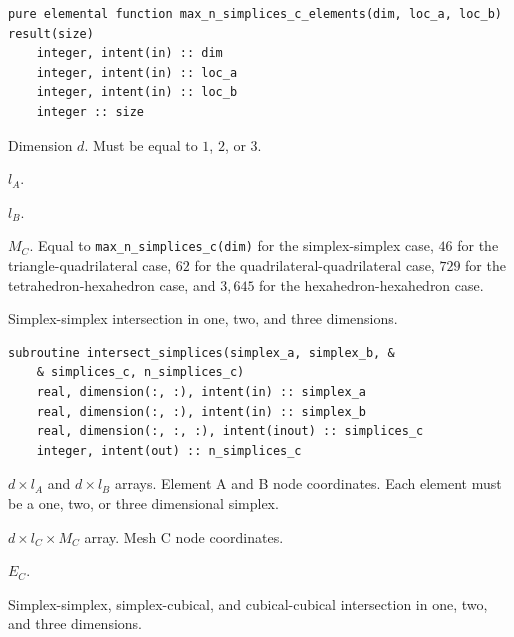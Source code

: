\documentclass{article}
\begin{document}
\begin{lstlisting}[language=FORTRAN]
  pure elemental function max_n_simplices_c_elements(dim, loc_a, loc_b) result(size)
    integer, intent(in) :: dim
    integer, intent(in) :: loc_a
    integer, intent(in) :: loc_b
    integer :: size
\end{lstlisting}

\begin{description}[font=\ttfamily\bfseries,leftmargin=2.2\parindent,labelindent=1.7\parindent,noitemsep]
  \item[dim] Dimension $d$. Must be equal to $1$, $2$, or $3$.
  \item[loc\_a] $l_A$.
  \item[loc\_b] $l_B$.
  \item[size] $M_C$. Equal to \verb+max_n_simplices_c(dim)+ for the
    simplex-simplex case, $46$ for the \linebreak triangle-quadrilateral case,
    $62$ for the quadrilateral-quadrilateral case, $729$ for the \linebreak
    tetrahedron-hexahedron case, and $3,645$ for the hexahedron-hexahedron case.
\end{description}

\noindent Simplex-simplex intersection in one, two, and three dimensions.

\begin{lstlisting}[language=FORTRAN]
  subroutine intersect_simplices(simplex_a, simplex_b, &
    & simplices_c, n_simplices_c)
    real, dimension(:, :), intent(in) :: simplex_a
    real, dimension(:, :), intent(in) :: simplex_b
    real, dimension(:, :, :), intent(inout) :: simplices_c
    integer, intent(out) :: n_simplices_c
\end{lstlisting}

\begin{description}[font=\ttfamily\bfseries,leftmargin=2.2\parindent,labelindent=1.7\parindent,noitemsep]
  \item[simplex\_a, simplex\_b] $d \times l_A$ and $d \times l_B$ arrays.
    Element A and B node coordinates. Each element must be a one, two, or three
    dimensional simplex.
  \item[simplex\_c] $d \times l_C \times M_C$ array. Mesh C node coordinates.
  \item[n\_simplices\_c] $E_C$.
\end{description}

\noindent Simplex-simplex, simplex-cubical, and cubical-cubical
intersection in one, two, and three dimensions.
\end{document}
